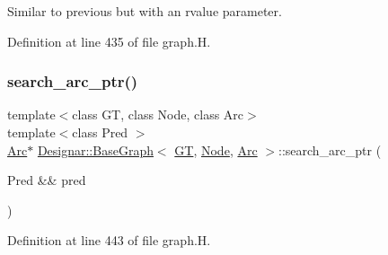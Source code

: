 Similar to previous but with an rvalue parameter. 



Definition at line 435 of file graph.\+H.

\mbox{\label{class_designar_1_1_base_graph_a4ffe61f2548a892d070aa46609c4532c}} 
\subsubsection{\texorpdfstring{search\+\_\+arc\+\_\+ptr()}{search\_arc\_ptr()}\hspace{0.1cm}{\footnotesize\ttfamily [2/2]}}
{\footnotesize\ttfamily template$<$class GT, class Node, class Arc$>$ \\
template$<$class Pred $>$ \\
\hyperlink{namespace_designar_a3f55fb5513d62ff47cbc8f72b8e95d6f}{Arc}$\ast$ \hyperlink{class_designar_1_1_base_graph}{Designar\+::\+Base\+Graph}$<$ \hyperlink{demo-buildgraph_8_c_a3001c40d2c31ca87ed96cd7d1334a55e}{GT}, \hyperlink{namespace_designar_a5af326c65aa2bd26b26c410f2030d09e}{Node}, \hyperlink{namespace_designar_a3f55fb5513d62ff47cbc8f72b8e95d6f}{Arc} $>$\+::search\+\_\+arc\+\_\+ptr (\begin{DoxyParamCaption}\item[{Pred \&\&}]{pred }\end{DoxyParamCaption})\hspace{0.3cm}{\ttfamily [inline]}}



Definition at line 443 of file graph.\+H.

\mbox{\label{class_designar_1_1_base_graph_aa15b13f58a4961b1593045d1e228adec}} 
